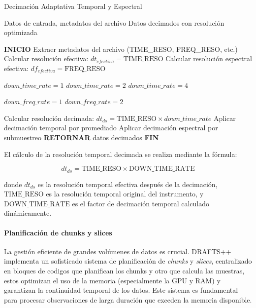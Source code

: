 \begin{algorithm}[H]
\caption{Decimación Adaptativa Temporal y Espectral}
\label{alg:adaptive-decimation}
\begin{algorithmic}[1]
\Require Datos de entrada, metadatos del archivo
\Ensure Datos decimados con resolución optimizada

\State \textbf{INICIO}
\State Extraer metadatos del archivo (TIME\_RESO, FREQ\_RESO, etc.)
\State Calcular resolución efectiva: $dt_{efectiva} = \text{TIME\_RESO}$
\State Calcular resolución espectral efectiva: $df_{efectiva} = \text{FREQ\_RESO}$

    \State $down\_time\_rate = 1$ 
    \State $down\_time\_rate = 2$ 
\Else
    \State $down\_time\_rate = 4$ 
\EndIf

    \State $down\_freq\_rate = 1$ 
\Else
    \State $down\_freq\_rate = 2$ 
\EndIf

\State Calcular resolución decimada: $dt_{ds} = \text{TIME\_RESO} \times down\_time\_rate$
\State Aplicar decimación temporal por promediado
\State Aplicar decimación espectral por submuestreo
\State \textbf{RETORNAR} datos decimados
\State \textbf{FIN}
\end{algorithmic}
\end{algorithm}

El cálculo de la resolución temporal decimada se realiza mediante la fórmula:

\[
dt_{ds} = \text{TIME\_RESO} \times \text{DOWN\_TIME\_RATE}
\]

donde $dt_{ds}$ es la resolución temporal efectiva después de la decimación, $\text{TIME\_RESO}$ es la resolución temporal original del instrumento, y $\text{DOWN\_TIME\_RATE}$ es el factor de decimación temporal calculado dinámicamente.

\paragraph{Planificación de chunks y slices}

La gestión eficiente de grandes volúmenes de datos es crucial. DRAFTS++ implementa un sofisticado sistema de planificación de \emph{chunks} y \emph{slices}, centralizado en bloques de codigos que planifican los chunks y otro que calcula las muestras, estos optimizan el uso de la memoria (especialmente la GPU y RAM) y garantizan la continuidad temporal de los datos. Este sistema es fundamental para procesar observaciones de larga duración que exceden la memoria disponible.

